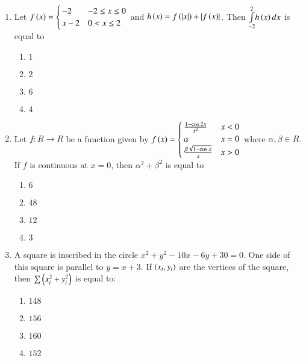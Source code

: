 \documentclass[journal]{IEEEtran}
\begin{document}
\begin{enumerate}
\setcounter{enumi}{0}
 
    \item Let $
    f\left(x\right)=
    \begin{cases}
    -2 & -2\leq x \leq 0\\
    x-2 & 0 < x \leq2
    \end{cases}$ and $h\left(x\right)=f\left(\left\vert x\right\vert\right)+\left\vert f\left(x\right)\right\vert$. Then $\underset{-2}{\overset{2}{\int}}h\left(x\right) dx$ is equal to

        \begin{multicols}{4}
            \begin{enumerate}
                \item $1$
                \item $2$
                \item $6$
                \item $4$
            \end{enumerate}
        \end{multicols}

    \item Let $f:R\to R$ be a function given by 
    $f\left(x\right)=
    \begin{cases}
        \frac{1-\cos2x}{x^2} & x<0\\
        \alpha & x=0\\
        \frac{\beta\sqrt{1-\cos x}}{x} & x>0
    \end{cases}$ where $\alpha,\beta\in R$. If $f$ is continuous at $x=0$, then $\alpha^2+\beta^2$ is equal to

		\begin{multicols}{4}
			\begin{enumerate}
				\item $6$
				\item $48$
				\item $12$
				\item $3$
			\end{enumerate}
		\end{multicols}

    \item A square is inscribed in the circle $x^2+y^2-10x-6y+30=0$. One side of this square is parallel to $y=x+3$. If $\left(x_i,y_i\right)$ are the vertices of the square, then $\sum\left(x_i^2+y_i^2\right)$ is equal to:

        \begin{multicols}{4}
            \begin{enumerate}
                \item $148$
                \item $156$
                \item $160$
                \item $152$
            \end{enumerate}
        \end{multicols}


\end{enumerate}
\end{document}
